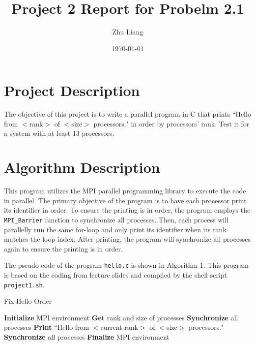 \documentclass[12pt,a4paper]{article}
\title{Project 2 Report for Probelm 2.1}
\author{Zhu Liang}
\date{\today}
\begin{document}
\maketitle

\section{Project Description}
The objective of this project is to write a parallel program in C that prints ``Hello from $<$rank$>$ of $<$size$>$ processors." in order by processors' rank. 
Test it for a system with at least 13 processors.

\section{Algorithm Description}
This program utilizes the MPI parallel programming library to execute the code in parallel.
The primary objective of the program is to have each processor print its identifier in order. 
To ensure the printing is in order, the program employs the \texttt{MPI\_Barrier} function to synchronize all processes.
Then, each process will parallelly run the same for-loop and only print its identifier when its rank matches the loop index. 
After printing, the program will synchronize all processes again to ensure the printing is in order.


The pseudo-code of the program \texttt{hello.c} is shown in Algorithm 1. 
This program is based on the coding from lecture slides \cite{deng2023principles} and compiled by the shell script \texttt{project1.sh}.

\begin{algorithm}
    \caption{Fix Hello Order}
    \begin{algorithmic}[1]
    \State \textbf{Initialize} MPI environment
    \State \textbf{Get} rank and size of processes
    \State \textbf{Synchronize} all processes
            \State \textbf{Print} ``Hello from $<$current rank$>$ of $<$size$>$ processors."
        \EndIf
        \State \textbf{Synchronize} all processes
    \EndFor
    \State \textbf{Finalize} MPI environment
    \EndProcedure
    \end{algorithmic}
\end{algorithm}
\end{document}
